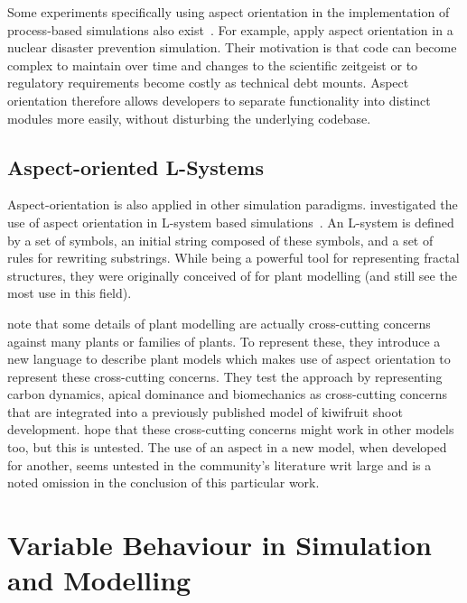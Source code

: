 Some experiments specifically using aspect orientation in the implementation of
process-based simulations also exist\cite{Ionescu_2009}~. For
example, \citeauthor{Ionescu_2009} apply aspect orientation in a nuclear
disaster prevention simulation. Their motivation is that code can become complex
to maintain over time and changes to the scientific zeitgeist or to regulatory
requirements become costly as technical debt mounts. Aspect orientation
therefore allows developers to separate functionality into distinct modules more
easily, without disturbing the underlying codebase.

\subsection{Aspect-oriented L-Systems}
Aspect-orientation is also applied in other simulation paradigms.
\citeauthor{Cieslak_2011} investigated the use of aspect orientation in L-system
based simulations~\cite{Cieslak_2011}. An L-system\cite{lindenmayer1968lsystem}
is defined by a set of symbols, an initial string composed of these symbols, and
a set of rules for rewriting substrings. While being a powerful tool for
representing fractal structures, they were originally conceived of for plant
modelling (and still see the most use in this field).

\citeauthor{Cieslak_2011} note that some details of plant modelling are actually
cross-cutting concerns against many plants or families of plants. To represent
these, they introduce a new language to describe plant models which makes use of
aspect orientation to represent these cross-cutting concerns. They test the
approach by representing carbon dynamics, apical dominance and biomechanics as
cross-cutting concerns that are integrated into a previously published model of
kiwifruit shoot development. \citeauthor{Cieslak_2011} hope that these
cross-cutting concerns might work in other models too, but this is untested. The
use of an aspect in a new model, when developed for another, seems untested in
the community's literature writ large and is a noted omission in the conclusion
of this particular work.



\section{Variable Behaviour in Simulation and Modelling}\label{sec:dynamism_in_sm}

